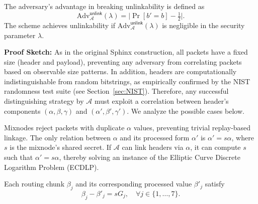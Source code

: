 \noindent The adversary's advantage in breaking unlinkability is defined as
$$
\mathrm{Adv}^{\mathsf{unlink}}_{\mathcal{A}}(\lambda)
= \big| \Pr[b' = b] - \tfrac{1}{2} \big|.
$$
The scheme achieves unlinkability if $\mathrm{Adv}^{\mathsf{unlink}}_{\mathcal{A}}(\lambda)$ is negligible in the security parameter $\lambda$.
\newline

\noindent\textbf{Proof Sketch:}
As in the original Sphinx construction, all packets have a fixed size (header and payload), preventing any adversary from correlating packets based on observable size patterns.
In addition, headers are computationally indistinguishable from random bitstrings, as empirically confirmed by the NIST randomness test suite (see Section~\ref{sec:NIST}).
Therefore, any successful distinguishing strategy by $\mathcal{A}$ must exploit a correlation between header's components $(\alpha, \beta, \gamma)$ and $(\alpha', \beta', \gamma')$.  
We analyze the possible cases below.
\newline

Mixnodes reject packets with duplicate $\alpha$ values, preventing trivial replay-based linkage.  
The only relation between $\alpha$ and its processed form $\alpha'$ is $\alpha' = s \alpha$, where $s$ is the mixnode's shared secret.  
If $\mathcal{A}$ can link headers via $\alpha$, it can compute $s$ such that $\alpha' = s \alpha$, thereby solving an instance of the Elliptic Curve Discrete Logarithm Problem (ECDLP).
\newline

\label{sec:indep_generators}  
Each routing chunk $\beta_j$ and its corresponding processed value $\beta'_j$ satisfy
$$
\beta_j - \beta'_j = s G_j, \quad \forall j \in \{1, \dots, 7\}.
$$

